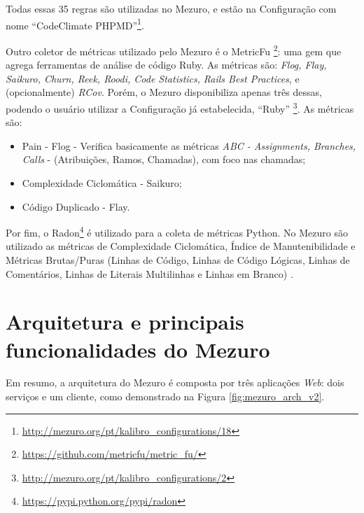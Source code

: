 Todas essas 35 regras são utilizadas no Mezuro, e estão na Configuração com nome
``CodeClimate PHPMD''\footnote{\url{http://mezuro.org/pt/kalibro_configurations/18}}.

Outro coletor de métricas utilizado pelo Mezuro é o MetricFu
\footnote{\url{https://github.com/metricfu/metric_fu/}}: uma gem que agrega
ferramentas de análise de código Ruby. As métricas são: \textit{Flog, Flay,
Saikuro, Churn, Reek, Roodi, Code Statistics,} \textit{Rails Best Practices}, e
(opcionalmente) \textit{RCov}. Porém, o Mezuro disponibiliza apenas três dessas,
podendo o usuário utilizar a Configuração já estabelecida, ``Ruby''
\footnote{\url{http://mezuro.org/pt/kalibro_configurations/2}}.
%
As métricas são\cite{rubySadist}:

\begin{itemize}
  \item Pain - Flog - Verifica basicamente as métricas \textit{ABC - Assignments,
        Branches, Calls} - (Atribuições, Ramos, Chamadas), com foco nas chamadas;
  \item Complexidade Ciclomática - Saikuro;
  \item Código Duplicado - Flay.
\end{itemize}

Por fim, o Radon\footnote{\url{https://pypi.python.org/pypi/radon}} é utilizado
para a coleta de métricas Python. No Mezuro são utilizado as métricas de
Complexidade Ciclomática, Índice de Manutenibilidade e Métricas Brutas/Puras
(Linhas de Código, Linhas de Código Lógicas, Linhas de Comentários, Linhas de
Literais Multilinhas e Linhas em Branco) \cite{radonDoc}.

\section{Arquitetura e principais funcionalidades do Mezuro}

Em resumo, a arquitetura do Mezuro é composta por três aplicações \textit{Web}:
dois serviços e um cliente, como demonstrado na Figura \ref{fig:mezuro_arch_v2}.

